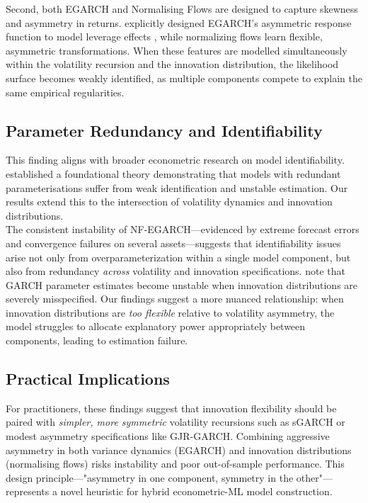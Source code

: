 \documentclass[oneside,12pt]{CUEDthesisPSnPDF}
\newcommand{\textcite}{\citet}
\newcommand{\parencite}{\citep}
\begin{document}
Second, both EGARCH and Normalising Flows are designed to capture skewness and asymmetry in returns. \textcite{nelson1991conditional} explicitly designed EGARCH's asymmetric response function to model leverage effects \parencite{black1976studies, campbell1992no}, while normalizing flows learn flexible, asymmetric transformations. When these features are modelled simultaneously within the volatility recursion and the innovation distribution, the likelihood surface becomes weakly identified, as multiple components compete to explain the same empirical regularities.\\

\subsection{Parameter Redundancy and Identifiability}
\noindent
This finding aligns with broader econometric research on model identifiability. \textcite{rothenberg1971identification} established a foundational theory demonstrating that models with redundant parameterisations suffer from weak identification and unstable estimation. Our results extend this to the intersection of volatility dynamics and innovation distributions.\\

The consistent instability of NF-EGARCH—evidenced by extreme forecast errors and convergence failures on several assets—suggests that identifiability issues arise not only from overparameterization within a single model component, but also from redundancy \emph{across} volatility and innovation specifications. \textcite{francq2010garch} note that GARCH parameter estimates become unstable when innovation distributions are severely misspecified. Our findings suggest a more nuanced relationship: when innovation distributions are \emph{too flexible} relative to volatility asymmetry, the model struggles to allocate explanatory power appropriately between components, leading to estimation failure.\\

\subsection{Practical Implications}
\noindent
For practitioners, these findings suggest that innovation flexibility should be paired with \emph{simpler, more symmetric} volatility recursions such as sGARCH or modest asymmetry specifications like GJR-GARCH. Combining aggressive asymmetry in both variance dynamics (EGARCH) and innovation distributions (normalising flows) risks instability and poor out-of-sample performance. This design principle—"asymmetry in one component, symmetry in the other"—represents a novel heuristic for hybrid econometric-ML model construction.\\
\end{document}

